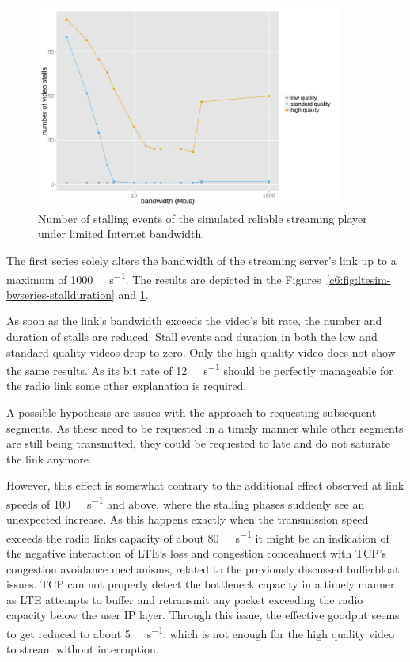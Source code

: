 \begin{figure}[htb]
	\centering
	\includegraphics[width=0.9\textwidth]{images/R-ltesim-bwseries-numstalls.pdf}
	\caption{Number of stalling events of the simulated reliable streaming player under limited Internet bandwidth.}
\label{c6:fig:ltesim-bwseries-numstalls}
\end{figure}

The first series solely alters the bandwidth of the streaming server's link up to a maximum of \SI{1000}{\mega\bit\per\second}. The results are depicted in the Figures~\ref{c6:fig:ltesim-bwseries-stallduration} and \ref{c6:fig:ltesim-bwseries-numstalls}.

As soon as the link's bandwidth exceeds the video's bit rate, the number and duration of stalls are reduced. Stall events and duration in both the low and standard quality videos drop to zero. Only the high quality video does not show the same results. As its bit rate of \SI{12}{\mega\bit\per\second} should be perfectly manageable for the radio link some other explanation is required. 

A possible hypothesis are issues with the approach to requesting subsequent segments. As these need to be requested in a timely manner while other segments are still being transmitted, they could be requested to late and do not saturate the link anymore. 

However, this effect is somewhat contrary to the additional effect observed at link speeds of \SI{100}{\mega\bit\per\second} and above, where the stalling phases suddenly see an unexpected increase. As this happens exactly when the transmission speed exceeds the radio links capacity of about \SI{80}{\mega\bit\per\second} it might be an indication of the negative interaction of \gls{LTE}'s loss and congestion concealment with \gls{TCP}'s congestion avoidance mechanisms, related to the previously discussed bufferbloat issues. \gls{TCP} can not properly detect the bottleneck capacity in a timely manner as \gls{LTE} attempts to buffer and retransmit any packet exceeding the radio capacity below the user \gls{IP} layer. Through this issue, the effective goodput seems to get reduced to about \SI{5}{\mega\bit\per\second}, which is not enough for the high quality video to stream without interruption.

